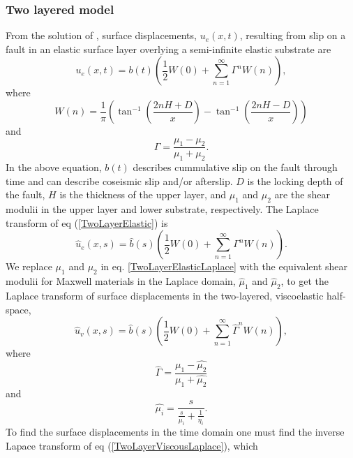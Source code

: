 \documentclass[extra,mreferee]{gji}
\begin{document}
\subsubsection{Two layered model}
From the solution of \citet{R1971}, surface displacements,
$u_{e}(x,t)$, resulting from slip on a fault in an elastic surface
layer overlying a semi-infinite elastic substrate are
\begin{equation}\label{TwoLayerElastic}
  u_{e}(x,t) = b(t)\left(\frac{1}{2} W(0) + 
    \sum_{n=1}^\infty \Gamma^nW(n)\right),
\end{equation}
where
\begin{equation}
  W(n) = \frac{1}{\pi}\left(\tan^{-1}\left(\frac{2nH + D}{x}\right) 
    - \tan^{-1}\left(\frac{2nH - D}{x}\right)\right)
\end{equation}
and
\begin{equation}
  \Gamma = \frac{\mu_1 - \mu_2}{\mu_1 + \mu_2}.
\end{equation}
In the above equation, $b(t)$ describes cummulative slip on the fault
through time and can describe coseismic slip and/or afterslip. $D$ is
the locking depth of the fault, $H$ is the thickness of the upper
layer, and $\mu_1$ and $\mu_2$ are the shear modulii in the upper
layer and lower substrate, respectively.  The Laplace transform of eq
(\ref{TwoLayerElastic}) is
\begin{equation}\label{TwoLayerElasticLaplace}
 \hat{u}_e(x,s) = \hat{b}(s)\left(\frac{1}{2} W(0) +\sum_{n=1}^\infty\Gamma^nW(n)\right).
\end{equation}
We replace $\mu_1$ and $\mu_2$ in eq. \ref{TwoLayerElasticLaplace}
with the equivalent shear modulii for Maxwell materials in the Laplace
domain, $\hat{\mu}_1$ and $\hat{\mu}_2$, to get the Laplace
transform of surface displacements in the two-layered, viscoelastic
half-space,
\begin{equation}\label{TwoLayerViscousLaplace}
 \hat{u}_v(x,s) = \hat{b}(s)\left(\frac{1}{2}W(0) +\sum_{n=1}^\infty\hat{\Gamma}^nW(n)\right),
\end{equation}
where
\begin{equation}
  \hat{\Gamma} = \frac{\hat{\mu_1} - \hat{\mu_2}}{\hat{\mu_1} + \hat{\mu_2}}
\end{equation}
and
\begin{equation}
  \hat{\mu_i} = \frac{s}{\frac{s}{\mu_i} + \frac{1}{\eta_i}}.
\end{equation}
To find the surface displacements in the time domain one must find the
inverse Lapace transform of eq (\ref{TwoLayerViscousLaplace}), which
\end{document}
